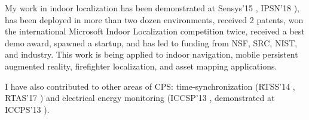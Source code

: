 \documentclass[10pt]{article}
\begin{document}
My work in indoor localization has been demonstrated at
Sensys'15 \cite{lazik2015alpsdemo}, IPSN'18 \cite{rajagopal2018welcome}), has been deployed in more than two dozen environments, received 2 patents, won the international
Microsoft Indoor Localization competition twice, received a best demo
award, spawned a startup, and has led to funding from NSF, SRC, NIST, and
industry. This work is being applied to indoor navigation, mobile
persistent augmented reality, firefighter localization, and asset
mapping applications.  

I have also contributed to other areas of CPS:
time-synchronization (RTSS'14 \cite{buevich2013hardware}, RTAS'17 \cite{dongare2017pulsar}) and electrical energy
monitoring (ICCSP'13 \cite{rajagopal2013magnetic}, demonstrated at ICCPS'13 \cite{rajagopal2013demo}).






\end{document}
